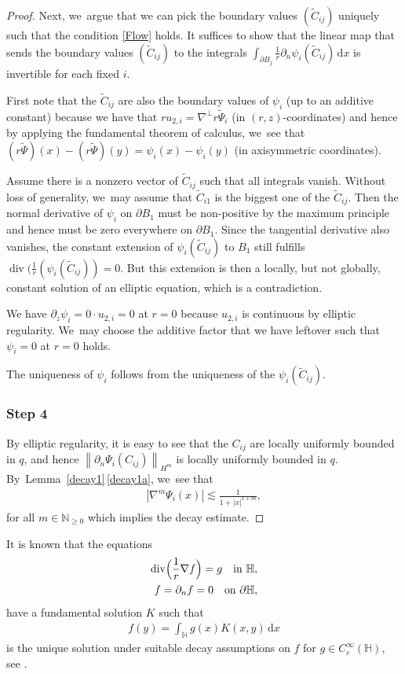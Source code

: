 \documentclass[JEP,XML,SOM,Unicode,published]{cedram}
\theoremstyle{definition}
\renewcommand{\div}{\operatorname{div}}
\newcommand\N{\mathbb{N}}
\newcommand\norm[1]{\left\lVert #1\right\rVert}
\newcommand\eq{=}
\newcommand\dd{\,\mathrm{d}}
\newcommand\dx{\dd x}
\let\de\partial
\begin{document}
\begin{proof}
Next, we~argue that we can pick the boundary values $(\tilde{C}_{ij})$ uniquely such that the condition \eqref{Flow} holds. It suffices to show that the linear map that sends the boundary values $(\tilde{C}_{ij})$ to the integrals $\int_{\de B_j}\frac{1}{r}\de_{n}\psi_i(\tilde{C}_{ij})\dx$ is invertible for each fixed $i$.

First note that the $\tilde{C}_{ij}$ are also the boundary values of $\psi_i$ (up to an additive constant) because we have that $ru_{2,i}=\nabla^\perp r\tilde{\Psi}_i$ (in $(r,z)$-coordinates) and hence by applying the fundamental theorem of calculus, we~see that $(r\tilde{\Psi})(x)-(r\tilde{\Psi})(y)=\psi_i(x)-\psi_i(y)$ (in axisymmetric coordinates).

Assume there is a nonzero vector of $\tilde{C}_{ij}$ such that all integrals vanish. Without loss of generality, we~may assume that $\tilde{C}_{i1}$ is the biggest one of the $\tilde{C}_{ij}$. Then the normal derivative of $\psi_i$ on $\de B_1$ must be non-positive by the maximum principle and hence must be zero everywhere on $\de B_1$. Since the tangential derivative also vanishes, the constant extension of $\psi_i(\tilde{C}_{ij})$ to $B_1$ still fulfills $\div(\frac{1}{r}(\psi_i(\tilde{C}_{ij}))=0$. But this extension is then a locally, but not globally, constant solution of an elliptic equation, which is a contradiction.

We have $\de_z\psi_i=0\cdot u_{2,i}=0$ at $r=0$ because $u_{2,i}$ is continuous by elliptic regularity. We~may choose the additive factor that we have leftover such that $\psi_i=0$ at $r=0$ holds.

The uniqueness of $\psi_i$ follows from the uniqueness of the $\psi_i(\tilde{C}_{ij})$.

\subsubsection*{Step 4} By elliptic regularity, it is easy to see that the $C_{ij}$ are locally uniformly bounded in $q$, and hence $\norm{\de_n\Psi_i(C_{ij})}_{H^m}$ is locally uniformly bounded in $q$. By~Lem\-ma~\ref{decay1}\,\eqref{decay1a}, we~see that
\begin{align*}|\nabla^m\Psi_i(x)|\lesssim \frac{1}{1+|x|^{1+m}},
\end{align*}
for all $m\in \N_{\geq 0}$ which implies the decay estimate.
\end{proof}

It is known that the equations
\begin{align*}
\div\Bigl(\frac{1}{r}\nabla f\Bigr)\eq g\quad\text{in $\mathbb{H}$},\\
f\eq\de_nf\eq 0\quad\text{on $\de\mathbb{H}$},
\end{align*}
have a fundamental solution $K$ such that
\begin{align}\label{definition K}
f(y)\eq \int_{\mathbb{H}}g(x)K(x,y)\dx
\end{align}
is the unique solution under suitable decay assumptions on $f$ for \eg $g\in C_c^\infty(\mathbb{H})$, see \eg \cite[\S 2]{GallaySverak}.
\end{document}
